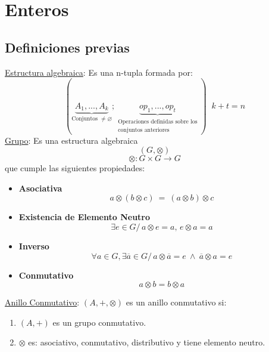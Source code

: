 \documentclass{article}
\newcommand{\lands}{\:\land\:}                          %
\newcommand{\comma}{,\,}                                %
\newcommand{\tq}{/\,}                                   %
\newcommand{\eq}{\:=\:}                                 %
\begin{document}
\section{Enteros}
\subsection{Definiciones previas}
\underline{Estructura algebraica}: Es una n-tupla formada por:
\begin{equation*}
    (\underbrace{ A_1,...,A_k}_{\text{Conjuntos $\neq \varnothing$}};\underbrace{op_1,...,op_t}_{\substack{\text{Operaciones definidas sobre los} \\ \text{conjuntos anteriores}}}) \;\; k+t=n
\end{equation*}
\underline{Grupo}: Es una estructura algebraica
\begin{equation*}
    (G , \otimes)
\end{equation*}
\begin{equation*}
    \otimes : G \times G \rightarrow G
\end{equation*}
que cumple las siguientes propiedades:
\begin{itemize}
    \item \textbf{Asociativa}
    \begin{equation*}
        a \otimes (b \otimes c) \eq (a \otimes b) \otimes c
    \end{equation*}
    \item \textbf{Existencia de Elemento Neutro}
    \begin{equation*}
        \exists e \in G \tq a \otimes e = a \comma e \otimes a = a
    \end{equation*}
    \item \textbf{Inverso}
    \begin{equation*}
        \forall a \in G, \exists \overline{a} \in G \tq a \otimes \overline{a} = e \lands \overline{a} \otimes a = e
    \end{equation*}
    \item \textbf{Conmutativo}
    \begin{equation*}
        a \otimes b = b \otimes a
    \end{equation*}
\end{itemize}
\underline{Anillo Conmutativo}: $(A, +, \otimes)$ es un anillo conmutativo si:
\begin{enumerate}
    \item $(A, +)$ es un grupo conmutativo.
    \item $\otimes$ es: asociativo, conmutativo, distributivo y tiene elemento neutro.
\end{enumerate}
\end{document}
